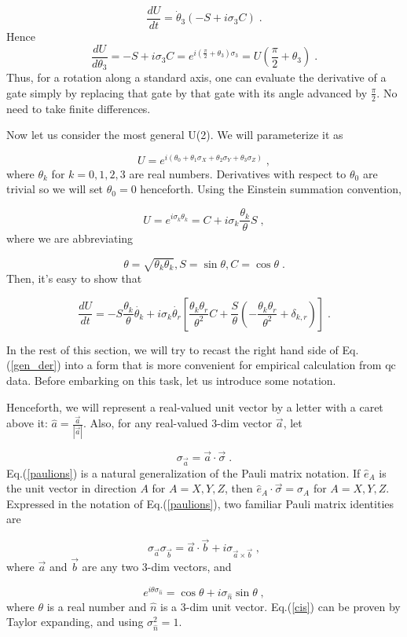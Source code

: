 \documentclass[12pt]{article}
\newcommand{\beq}{\begin{equation}}
\newcommand{\eeq}{\end{equation}}
\begin{document}
\beq
\frac{dU}{dt} = \dot{\theta}_3(-S + i\sigma_3 C)
\;.
\eeq
Hence
\beq
\frac{dU}{d\theta_3}=
-S + i\sigma_3 C=e^{i(\frac{\pi}{2}+\theta_3)\sigma_3}
=U(\frac{\pi}{2}+\theta_3)
\;.
\eeq
Thus, for a rotation along a standard axis,
one can evaluate the derivative of a gate
simply
by replacing that gate by that gate
with its angle advanced by $\frac{\pi}{2}$.
No need to take finite differences.

Now let us consider the most general U(2).
We will parameterize it as

\beq
U= e^{i(\theta_0 + \theta_1\sigma_X
+ \theta_2\sigma_Y
+ \theta_3\sigma_Z)}
\;,
\label{u2_pametrization}
\eeq
where $\theta_k$ for $k = 0, 1, 2, 3$ are real numbers.
Derivatives with respect to $\theta_0$
are trivial so we will set $\theta_0=0$ henceforth.
Using the Einstein summation convention,

\beq U = e^{i\sigma_k\theta_k} = C +
i\sigma_k \frac{\theta_k}{\theta} S
\;,
\eeq
where we are abbreviating

\beq
\theta = \sqrt{\theta_k\theta_k},
 S = \sin\theta, C = \cos \theta
 \;.
 \eeq
 Then, it's easy to show that

 \beq
 \frac{dU}{dt}=-S \frac{\theta_k}{\theta}
 \dot{\theta_k}+ i\sigma_k\dot{\theta_r}
 \left[\frac{\theta_k\theta_r}{\theta^2} C+
  \frac{S}{\theta}(-\frac{\theta_k\theta_r}{\theta^2}
  + \delta_{k, r})\right]
  \;.
  \label{gen_der}
  \eeq

In the rest of this section,
we will try to recast the right hand side of
 Eq.(\ref{gen_der}) into a form that
 is more convenient for empirical
 calculation from qc data.
Before embarking on this task,
let us introduce some notation.

Henceforth, we will
represent a real-valued unit vector by
a letter with a caret above it:
$\hat{a} = \frac{\vec{a}}{|\vec{a}|}$.
Also, for any real-valued 3-dim vector $\vec{a}$, let

\beq
\sigma_{\vec{a}}=\vec{a}\cdot\vec{\sigma}
\;.
\label{paulions}
\eeq
Eq.(\ref{paulions}) is a natural generalization
of the Pauli matrix notation. If $\hat{e}_A$
is the unit vector in direction $A$ for $A=X,Y,Z$,
then $\hat{e}_A\cdot\vec{\sigma} = \sigma_A$ for
$A=X,Y,Z$. Expressed in
the notation of Eq.(\ref{paulions}),
two familiar Pauli matrix identities
are

\beq
\sigma_{\vec{a}}\sigma_{\vec{b}}=\vec{a}\cdot\vec{b}
+ i\sigma_{\vec{a}\times\vec{b}}
\;,
\eeq
where $\vec{a}$ and $\vec{b}$
are any two 3-dim vectors,
and

\beq
e^{i\theta\sigma_{\hat{n}}} = \cos\theta +
i\sigma_{\hat{n}}\sin\theta
\;,
\label{cis}
\eeq
where $\theta$ is a real number and $\hat{n}$
is a 3-dim unit vector. Eq.(\ref{cis})
can be proven by Taylor expanding,
and using $\sigma_{\hat{n}}^2=1$.
\end{document}
